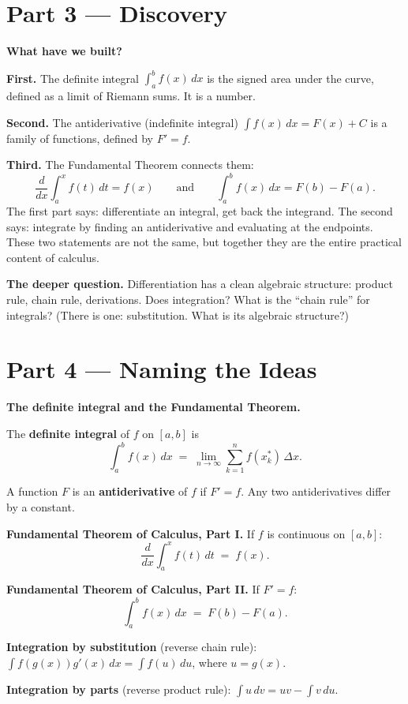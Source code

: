 \documentclass[12pt, a4paper]{article}
\begin{document}
\section{Part 3 \texorpdfstring{---}{--} Discovery}

\begin{discoverybox}
\textbf{What have we built?}

\textbf{First.} The definite integral $\int_a^b f(x)\,dx$ is the signed area under the curve, defined as a limit of Riemann sums. It is a number.

\textbf{Second.} The antiderivative (indefinite integral) $\int f(x)\,dx = F(x) + C$ is a family of functions, defined by $F' = f$.

\textbf{Third.} The Fundamental Theorem connects them:
\[
  \frac{d}{dx}\int_a^x f(t)\,dt = f(x) \qquad \text{and} \qquad \int_a^b f(x)\,dx = F(b) - F(a).
\]
The first part says: differentiate an integral, get back the integrand. The second says: integrate by finding an antiderivative and evaluating at the endpoints. These two statements are not the same, but together they are the entire practical content of calculus.

\medskip
\textbf{The deeper question.} Differentiation has a clean algebraic structure: product rule, chain rule, derivations. Does integration? What is the ``chain rule'' for integrals? (There is one: substitution. What is its algebraic structure?)
\end{discoverybox}

\section{Part 4 \texorpdfstring{---}{--} Naming the Ideas}

\begin{namebox}
\textbf{The definite integral and the Fundamental Theorem.}

The \textbf{definite integral} of $f$ on $[a,b]$ is
\[
  \int_a^b f(x)\,dx \;=\; \lim_{n\to\infty}\sum_{k=1}^n f(x_k^*)\,\Delta x.
\]

A function $F$ is an \textbf{antiderivative} of $f$ if $F' = f$. Any two antiderivatives differ by a constant.

\medskip
\textbf{Fundamental Theorem of Calculus, Part I.} If $f$ is continuous on $[a,b]$:
\[
  \frac{d}{dx}\int_a^x f(t)\,dt \;=\; f(x).
\]

\textbf{Fundamental Theorem of Calculus, Part II.} If $F' = f$:
\[
  \int_a^b f(x)\,dx \;=\; F(b) - F(a).
\]

\textbf{Integration by substitution} (reverse chain rule): $\displaystyle\int f(g(x))g'(x)\,dx = \int f(u)\,du$, where $u = g(x)$.

\textbf{Integration by parts} (reverse product rule): $\displaystyle\int u\,dv = uv - \int v\,du$.
\end{namebox}
\end{document}
